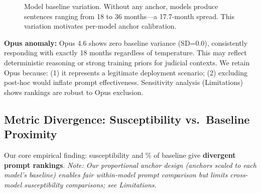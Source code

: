 \documentclass[11pt]{article}
\begin{document}
\begin{figure}[t]
\centering
{}
\caption{Model baseline variation. Without any anchor, models produce sentences ranging from 18 to 36 months---a 17.7-month spread. This variation motivates per-model anchor calibration.}
\label{fig:baselines}
\end{figure}

\textbf{Opus anomaly:} Opus 4.6 shows zero baseline variance (SD=0.0), consistently responding with exactly 18 months regardless of temperature. This may reflect deterministic reasoning or strong training priors for judicial contexts. We retain Opus because: (1) it represents a legitimate deployment scenario; (2) excluding post-hoc would inflate prompt effectiveness. Sensitivity analysis (Limitations) shows rankings are robust to Opus exclusion.

\subsection{Metric Divergence: Susceptibility vs.\ Baseline Proximity}
\label{sec:metric-divergence}

Our core empirical finding: susceptibility and \% of baseline give \textbf{divergent prompt rankings}. \textit{Note: Our proportional anchor design (anchors scaled to each model's baseline) enables fair within-model prompt comparison but limits cross-model susceptibility comparisons; see Limitations.}
\end{document}
